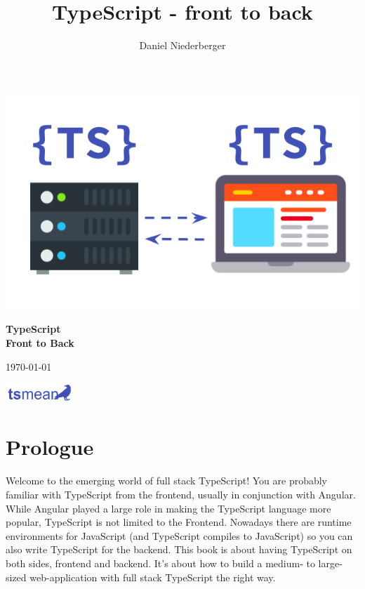 \documentclass[12pt,a4paper]{report}
\title{TypeScript - front to back}
\author{Daniel Niederberger}
\begin{document}
\begin{titlepage}
	\centering
	\includegraphics[width=1\textwidth]{figures/cover-image.png}\par
	\vspace{1.5cm}
	{\huge\bfseries TypeScript \\ \Huge{Front to Back}\par}
	\vspace{2cm}


	\vfill

	{\large \today\par}
	\vspace{0.5cm}
\includegraphics[width=2.5cm]{figures/tsmean-logo.pdf}

\end{titlepage}

\cleardoublepage
{}
\tableofcontents
\cleardoublepage
{}

\newpage



\chapter*{Prologue}
Welcome to the emerging world of full stack TypeScript! You are probably familiar with TypeScript from the frontend, usually in conjunction with Angular. While Angular played a large role in making the TypeScript language more popular, TypeScript is not limited to the Frontend. Nowadays there are runtime environments for JavaScript (and TypeScript compiles to JavaScript) so you can also write TypeScript for the backend. This book is about having TypeScript on both sides, frontend and backend. It's about how to build a medium- to large-sized web-application with full stack TypeScript the right way.
\end{document}
